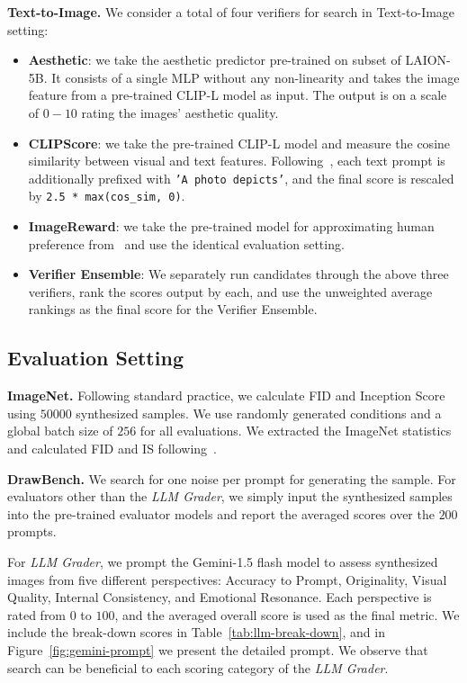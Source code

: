 \documentclass[11pt, letterpaper, logo]{googledeepmind}
\begin{document}
\textbf{Text-to-Image.} We consider a total of four verifiers for search in Text-to-Image setting: \begin{itemize}
    \item \textbf{Aesthetic}: we take the aesthetic predictor pre-trained on subset of LAION-5B. It consists of a single MLP without any non-linearity and takes the image feature from a pre-trained CLIP-L model as input. The output is on a scale of $0-10$ rating the images' aesthetic quality.
    \item \textbf{CLIPScore}: we take the pre-trained CLIP-L model and measure the cosine similarity between visual and text features. Following~\cite{hessel2021clipscore}, each text prompt is additionally prefixed with \texttt{'A photo depicts'}, and the final score is rescaled by \texttt{2.5 * max(cos\_sim, 0)}.
    \item \textbf{ImageReward}: we take the pre-trained model for approximating human preference from~\cite{xu2024imagereward} and use the identical evaluation setting. 
    \item \textbf{Verifier Ensemble}: We separately run candidates through the above three verifiers, rank the scores output by each, and use the unweighted average rankings as the final score for the Verifier Ensemble.
\end{itemize}

\vspace{-0.25cm}
\subsection{Evaluation Setting}


\textbf{ImageNet.} Following standard practice, we calculate FID and Inception Score using $50000$ synthesized samples. We use randomly generated conditions and a global batch size of $256$ for all evaluations. We extracted the ImageNet statistics and calculated FID and IS following~\citet{karras2024analyzing}.


\textbf{DrawBench.} We search for one noise per prompt for generating the sample. For evaluators other than the \textit{LLM Grader}, we simply input the synthesized samples into the pre-trained evaluator models and report the averaged scores over the $200$ prompts. 


For \textit{LLM Grader}, we prompt the Gemini-1.5 flash model to assess synthesized images from five different perspectives: Accuracy to Prompt, Originality, Visual Quality, Internal Consistency, and Emotional Resonance. Each perspective is rated from $0$ to $100$, and the averaged overall score is used as the final metric. We include the break-down scores in Table~\ref{tab:llm-break-down}, and in Figure~\ref{fig:gemini-prompt} we present the detailed prompt. We observe that search can be beneficial to each scoring category of the \textit{LLM Grader}.
\end{document}
